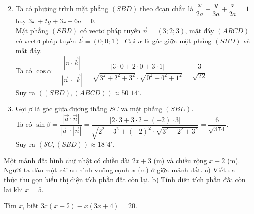 \begin{bt}
{\begin{enumerate}
			\setcounter{enumi}{1}
			\item Ta có phương trình mặt phẳng $(SBD)$ theo đoạn chắn là $\dfrac{x}{2a}+\dfrac{y}{3a}+\dfrac{z}{2a}=1$ hay $3x+2y+3z-6a=0$.\\
			Mặt phẳng $(SBD)$ có vectơ pháp tuyến $\overrightarrow{n}=(3;2;3)$, mặt đáy $(ABCD)$ có vectơ pháp tuyến $\overrightarrow{k}=(0;0;1)$. Gọi $\alpha$ là góc giữa mặt phẳng $(SBD)$ và mặt đáy.\\
			Ta có $\cos\alpha =\dfrac{\left |\overrightarrow{n}\cdot\overrightarrow{k} \right |}{\left |\overrightarrow{n} \right |\cdot\left |\overrightarrow{k} \right |}=\dfrac{\left |3\cdot 0+2\cdot 0+3\cdot 1 \right |}{\sqrt{3^2+2^2+3^2}\cdot\sqrt{0^2+0^2+1^2}}=\dfrac{3}{\sqrt{22}}$.\\
			Suy ra $\left ((SBD),(ABCD) \right )\approx 50^{\circ}14'$.
			\item Gọi $\beta$ là góc giữa đường thẳng $SC$ và mặt phẳng $(SBD)$.\\
			Ta có $\sin\beta =\dfrac{\left |\overrightarrow{u}\cdot\overrightarrow{n} \right |}{\left |\overrightarrow{u} \right |\cdot\left |\overrightarrow{n} \right |}=\dfrac{\left |2\cdot 3+3\cdot 2+(-2)\cdot 3 \right |}{\sqrt{2^2+3^2+(-2)^2}\cdot\sqrt{3^2+2^2+3^2}}=\dfrac{6}{\sqrt{374}}$.\\
			Suy ra $\left (SC,(SBD) \right )\approx 18^{\circ}4'$.
		\end{enumerate}
	}
\end{bt}

\begin{bt}%
	Một mảnh đất hình chữ nhật có chiều dài $2x + 3$ (m) và chiều rộng $x + 2$ (m). Người ta đào một cái ao hình vuông cạnh $x$ (m) ở giữa mảnh đất.
a) Viết đa thức thu gọn biểu thị diện tích phần đất còn lại.
b) Tính diện tích phần đất còn lại khi $x = 5$.
\end{bt}

\begin{bt}%
	Tìm $x$, biết $3x(x - 2) - x(3x + 4) = 20$.
\end{bt}

